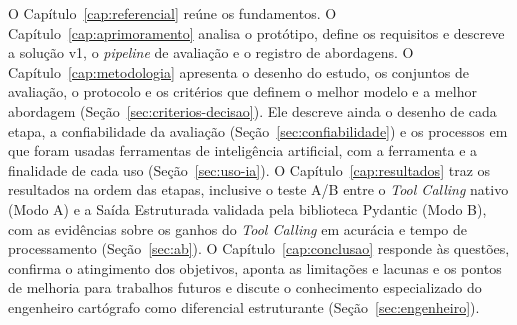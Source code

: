 O Capítulo~\ref{cap:referencial} reúne os fundamentos. O Capítulo~\ref{cap:aprimoramento} analisa o protótipo, define os requisitos e descreve a solução v1, o \textit{pipeline} de avaliação e o registro de abordagens. O Capítulo~\ref{cap:metodologia} apresenta o desenho do estudo, os conjuntos de avaliação, o protocolo e os critérios que definem o melhor modelo e a melhor abordagem (Seção~\ref{sec:criterios-decisao}). Ele descreve ainda o desenho de cada etapa, a confiabilidade da avaliação (Seção~\ref{sec:confiabilidade}) e os processos em que foram usadas ferramentas de inteligência artificial, com a ferramenta e a finalidade de cada uso (Seção~\ref{sec:uso-ia}). O Capítulo~\ref{cap:resultados} traz os resultados na ordem das etapas, inclusive o teste A/B entre o \textit{Tool Calling} nativo (Modo A) e a Saída Estruturada validada pela biblioteca Pydantic (Modo B), com as evidências sobre os ganhos do \textit{Tool Calling} em acurácia e tempo de processamento (Seção~\ref{sec:ab}). O Capítulo~\ref{cap:conclusao} responde às questões, confirma o atingimento dos objetivos, aponta as limitações e lacunas e os pontos de melhoria para trabalhos futuros e discute o conhecimento especializado do engenheiro cartógrafo como diferencial estruturante (Seção~\ref{sec:engenheiro}).
